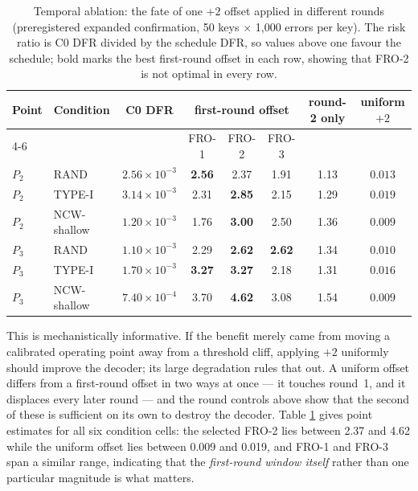 \documentclass[lettersize,journal]{IEEEtran}
\begin{document}
\begin{table}[t]
\centering
\caption{Temporal ablation: the fate of one $+2$ offset applied in different rounds (preregistered expanded confirmation, 50 keys $\times$ 1{,}000 errors per key). The risk ratio is C0 DFR divided by the schedule DFR, so values above one favour the schedule; bold marks the best first-round offset in each row, showing that FRO-2 is not optimal in every row.}
\label{tab:temporal}
\footnotesize
\begin{tabular}{@{}llcccccc@{}}
\toprule
\multirow{2}{*}{Point} & \multirow{2}{*}{Condition} & \multirow{2}{*}{C0 DFR}
 & \multicolumn{3}{c}{first-round offset} & \multirow{2}{*}{round-2 only} & \multirow{2}{*}{uniform $+2$} \\
\cmidrule(lr){4-6}
 & & & FRO-1 & FRO-2 & FRO-3 & & \\
\midrule
$P_2$ & RAND        & $2.56\times10^{-3}$ & \textbf{2.56} & 2.37 & 1.91 & 1.13 & $0.013$ \\
$P_2$ & TYPE-I      & $3.14\times10^{-3}$ & 2.31 & \textbf{2.85} & 2.15 & 1.29 & $0.019$ \\
$P_2$ & NCW-shallow & $1.20\times10^{-3}$ & 1.76 & \textbf{3.00} & 2.50 & 1.36 & $0.009$ \\
$P_3$ & RAND        & $1.10\times10^{-3}$ & 2.29 & \textbf{2.62} & \textbf{2.62} & 1.34 & $0.010$ \\
$P_3$ & TYPE-I      & $1.70\times10^{-3}$ & \textbf{3.27} & \textbf{3.27} & 2.18 & 1.31 & $0.016$ \\
$P_3$ & NCW-shallow & $7.40\times10^{-4}$ & 3.70 & \textbf{4.62} & 3.08 & 1.54 & $0.009$ \\
\bottomrule
\end{tabular}
\end{table}

This is mechanistically informative. If the benefit merely came from moving a calibrated operating point away from a threshold cliff, applying $+2$ uniformly should improve the decoder; its large degradation rules that out. A uniform offset differs from a first-round offset in two ways at once --- it touches round~1, and it displaces every later round --- and the round controls above show that the second of these is sufficient on its own to destroy the decoder. Table \ref{tab:temporal} gives point estimates for all six condition cells: the selected FRO-2 lies between 2.37 and 4.62 while the uniform offset lies between 0.009 and 0.019, and FRO-1 and FRO-3 span a similar range, indicating that the \emph{first-round window itself} rather than one particular magnitude is what matters.
\end{document}
